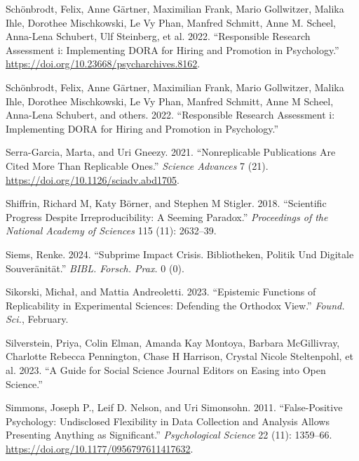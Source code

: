 \documentclass[
  letterpaper,
  DIV=11,
  numbers=noendperiod]{scrreprt}
\newlength{\cslhangindent}
\newenvironment{CSLReferences}[2] %
 {\begin{list}{}{%
  \setlength{\itemindent}{0pt}
  \setlength{\leftmargin}{0pt}
  \setlength{\parsep}{0pt}
  \ifodd #1
   \setlength{\leftmargin}{\cslhangindent}
   \setlength{\itemindent}{-1\cslhangindent}
  \fi
  \setlength{\itemsep}{#2\baselineskip}}}
 {\end{list}}
\begin{document}
\begin{CSLReferences}{1}{0}
Schönbrodt, Felix, Anne Gärtner, Maximilian Frank, Mario Gollwitzer,
Malika Ihle, Dorothee Mischkowski, Le Vy Phan, Manfred Schmitt, Anne M.
Scheel, Anna-Lena Schubert, Ulf Steinberg, et al. 2022. {``Responsible
Research Assessment i: Implementing DORA for Hiring and Promotion in
Psychology.''} \url{https://doi.org/10.23668/psycharchives.8162}.

Schönbrodt, Felix, Anne Gärtner, Maximilian Frank, Mario Gollwitzer,
Malika Ihle, Dorothee Mischkowski, Le Vy Phan, Manfred Schmitt, Anne M
Scheel, Anna-Lena Schubert, and others. 2022. {``Responsible Research
Assessment i: Implementing DORA for Hiring and Promotion in
Psychology.''}

Serra-Garcia, Marta, and Uri Gneezy. 2021. {``Nonreplicable Publications
Are Cited More Than Replicable Ones.''} \emph{Science Advances} 7 (21).
\url{https://doi.org/10.1126/sciadv.abd1705}.

Shiffrin, Richard M, Katy Börner, and Stephen M Stigler. 2018.
{``Scientific Progress Despite Irreproducibility: A Seeming Paradox.''}
\emph{Proceedings of the National Academy of Sciences} 115 (11):
2632--39.

Siems, Renke. 2024. {``Subprime Impact Crisis. Bibliotheken, Politik Und
Digitale Souver{ä}nit{ä}t.''} \emph{BIBL. Forsch. Prax.} 0 (0).

Sikorski, Michał, and Mattia Andreoletti. 2023. {``Epistemic Functions
of Replicability in Experimental Sciences: Defending the Orthodox
View.''} \emph{Found. Sci.}, February.

Silverstein, Priya, Colin Elman, Amanda Kay Montoya, Barbara
McGillivray, Charlotte Rebecca Pennington, Chase H Harrison, Crystal
Nicole Steltenpohl, et al. 2023. {``A Guide for Social Science Journal
Editors on Easing into Open Science.''}

Simmons, Joseph P., Leif D. Nelson, and Uri Simonsohn. 2011.
{``False-Positive Psychology: Undisclosed Flexibility in Data Collection
and Analysis Allows Presenting Anything as Significant.''}
\emph{Psychological Science} 22 (11): 1359--66.
\url{https://doi.org/10.1177/0956797611417632}.


\end{CSLReferences}
\end{document}

